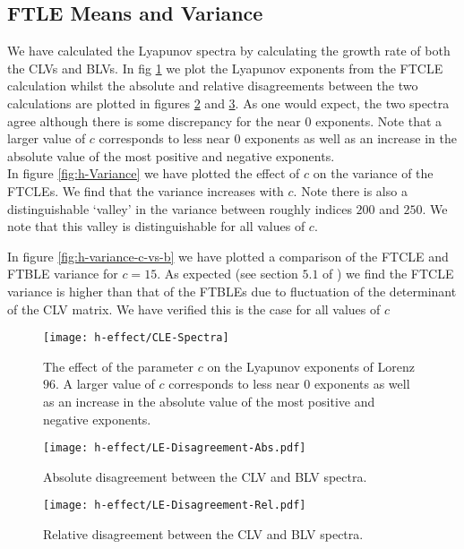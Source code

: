 \subsection{FTLE Means and Variance}

We have calculated the Lyapunov spectra by calculating the growth rate of both the CLVs and BLVs. In fig \ref{fig:h-effect-CLE} we plot the Lyapunov exponents from the FTCLE calculation whilst the absolute and relative disagreements between the two calculations are plotted in figures \ref{fig:h-Abs-Disagree} and \ref{fig:h-Rel-Disagree}. As one would expect, the two spectra agree although there is some discrepancy for the near $0$ exponents. Note that a larger value of $c$ corresponds to less near $0$ exponents as well as an increase in the absolute value of the most positive and negative exponents.\\

In figure \ref{fig:h-Variance} we have plotted the effect of $c$ on the variance of the FTCLEs. We find that the variance increases with $c$. Note there is also a distinguishable `valley' in the variance between roughly indices $200$ and $250$. We note that this valley is distinguishable for all values of $c$.

In figure \ref{fig:h-variance-c-vs-b} we have plotted a comparison of the FTCLE and FTBLE variance for $c = 15$. As expected (see section $5.1$ of \cite{Pikovsky2016}) we find the FTCLE variance is higher than that of the FTBLEs due to fluctuation of the determinant of the CLV matrix. We have verified this is the case for all values of $c$

\begin{figure}
\centering
\texttt{[image: h-effect/CLE-Spectra]}
\caption{The effect of the parameter $c$ on the Lyapunov exponents of Lorenz $96$. A larger value of $c$ corresponds to less near $0$ exponents as well as an increase in the absolute value of the most positive and negative exponents.}
\label{fig:h-effect-CLE}
\end{figure}

\begin{figure}
	\centering
    \texttt{[image: h-effect/LE-Disagreement-Abs.pdf]}
    \caption{Absolute disagreement between the CLV and BLV spectra.}
    \label{fig:h-Abs-Disagree}
\end{figure}

\begin{figure}
	\centering
    \texttt{[image: h-effect/LE-Disagreement-Rel.pdf]}
    \caption{Relative disagreement between the CLV and BLV spectra.}
    \label{fig:h-Rel-Disagree}
\end{figure}

